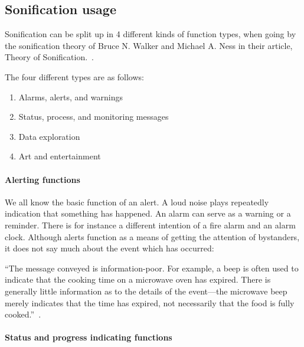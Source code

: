 
\FloatBarrier
\subsection{Sonification usage} %
\label{sub:sonification_usage}

Sonification can be split up in 4 different kinds of function types, when going by the sonification theory of Bruce N. Walker and Michael A. Ness in their article, Theory of Sonification.~\cite*[pp.3]{walker2011}. 

The four different types are as follows:

\begin{enumerate}
    \item Alarms, alerts, and warnings
    \item Status, process, and monitoring messages
    \item Data exploration
    \item Art and entertainment
\end{enumerate}


\paragraph{Alerting functions} %
\label{par:alerting_functions}

We all know the basic function of an alert. A loud noise plays repeatedly indication that something has happened. An alarm can serve as a warning or a reminder. There is for instance a different intention of a fire alarm and an alarm clock. Although alerts function as a means of getting the attention of bystanders, it does not say much about the event which has occurred:


\enquote{The message conveyed is information-poor. For example, a beep is often used to indicate that the cooking time on a microwave oven has expired. There is generally little information as to the details of the event—the microwave beep merely indicates that the time has expired, not necessarily that the food is fully cooked.}~\cite*[pp.4]{walker2011}. 



\paragraph{Status and progress indicating functions} %
\label{par:status_and_progress_functions}


